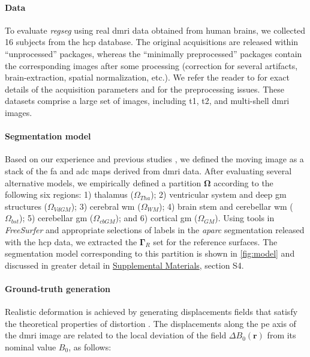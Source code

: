 \documentclass[3p,authoryear,fleqn]{elsarticle}
\providecommand{\omegaset}{\ensuremath{\boldsymbol{\Omega}}}
\providecommand{\gammaset}{\ensuremath{\boldsymbol{\Gamma}}}
\providecommand{\regseg}{\emph{regseg}}
\renewcommand{\vec}[1]{\mathbf{#1}}
\providecommand{\suppl}[1]{\href{http://figshare.com/s/459c26b4ee8211e493b306ec4bbcf141}{Supplemental Materials}, #1}
\begin{document}
\paragraph*{Data}
To evaluate \regseg{} using real \gls*{dmri} data obtained from human brains,
  we collected 16 subjects from the \gls*{hcp} database.
The original acquisitions are released within ``unprocessed'' packages, whereas
  the ``minimally preprocessed'' packages contain the corresponding images after
  some processing (correction for several artifacts, brain-extraction, spatial
  normalization, etc.).
We refer the reader to \citep{essen_human_2012} for exact details of the acquisition
  parameters and \citep{glasser_minimal_2013} for the preprocessing issues.
These datasets comprise a large set of images, including \gls*{t1}, \gls*{t2}, and
  multi-shell \gls*{dmri} images.

\paragraph*{Segmentation model}
Based on our experience   and previous studies \citep{ennis_orthogonal_2006},
  we defined the moving image as a stack of the \gls*{fa} and \gls*{adc} maps derived
  from \gls*{dmri} data.
After evaluating several alternative models, we empirically defined a partition \omegaset{}
  according to the following six regions:
  1) thalamus ($\Omega_{Tha}$);
  2) ventricular system and deep \gls*{gm} structures ($\Omega_{VdGM}$);
  3) cerebral \gls*{wm} ($\Omega_{WM}$);
  4) brain stem and cerebellar \gls*{wm} ($\Omega_{bst}$);
  5) cerebellar \gls*{gm} ($\Omega_{cbGM}$); and
  6) cortical \gls*{gm} ($\Omega_{GM}$).
Using tools in \emph{FreeSurfer} and appropriate selections of labels in the
  \emph{aparc} segmentation released with the \gls*{hcp} data, we extracted the $\gammaset_R$ set for the
  reference surfaces.
The segmentation model corresponding to this partition is shown in \autoref{fig:model}
  and discussed in greater detail in \suppl{section S4}.

\paragraph*{Ground-truth generation}
Realistic deformation is achieved by generating displacements fields that satisfy the theoretical
  properties of distortion \citep{jezzard_correction_1995}.
The displacements along the \gls*{pe} axis of the \gls*{dmri} image are related to the local
  deviation of the field $\Delta B_0(\vec{r})$ from its nominal value $B_0$, as follows:
\end{document}
